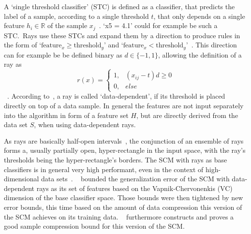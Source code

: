 A `single threshold classifier' (STC) is defined as a classifier, that predicts the label of a sample,
according to a single threshold \(t\), that only depends on a single feature \(h_i \in \mathbb{R}\) of the sample \(x_j\)~\citep{kestler11,marchand04}.
`x5 = 4.1' could for example be such a STC.\
Rays use these STCs and expand them by a direction to produce rules in the form of `\(\text{feature}_x \geq \text{threshold}_y\)' and `\(\text{feature}_x < \text{threshold}_y\)'~\citep{marchand04}.
This direction can for example be be defined binary as \(d \in \{-1,1\}\), allowing the definition of a ray as
\[r(x) =
\begin{cases}
    1, & (x_{ij} - t)d \geq 0 \\
    0, & else
\end{cases}\]~\citep{kestler11}.
According to~\cite{kestler11}, a ray is called `data-dependent', if its threshold is placed directly on top of a data sample.
In general the features are not input separately into the algorithm in form of a feature set \(H\), but are directly derived from the data set \(S\),
when using data-dependent rays.

As rays are basically half-open intervals~\citep{kestler11}, the conjunction of an ensemble of rays forms a, usually partially open, hyper-rectangle in the input space,
with the ray's thresholds being the hyper-rectangle's borders.
The SCM with rays as base classifiers is in general very high performant, even in the context of high-dimensional data sets~\citep{kestler11}.
~\cite{kestler06} bounded the generalization error of the SCM with data-dependent rays as its set of features based on the Vapnik-Chervonenkis (VC) dimension of the base classifier space.
Those bounds were then tightened by new error bounds, this time based on the amount of data compression this version of the SCM achieves on its training data.
~\cite{kestler11} furthermore constructs and proves a good sample compression bound for this version of the SCM.\